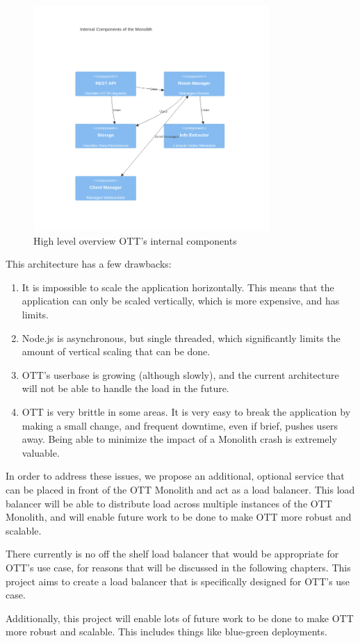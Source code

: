 \begin{figure}[!h]
  \centering
  \includegraphics[width=0.8\textwidth]{Figures/components-monolith.png}
  \caption{High level overview OTT's internal components}
  \label{Figure::components-monolith}
\end{figure}

This architecture has a few drawbacks:

\begin{enumerate}
  \item It is impossible to scale the application horizontally. This means that the application can only be scaled vertically, which is more expensive, and has limits.
  \item Node.js is asynchronous, but single threaded, which significantly limits the amount of vertical scaling that can be done.
  \item OTT's userbase is growing (although slowly), and the current architecture will not be able to handle the load in the future.
  \item OTT is very brittle in some areas. It is very easy to break the application by making a small change, and frequent downtime, even if brief, pushes users away. Being able to minimize the impact of a Monolith crash is extremely valuable.
\end{enumerate}

In order to address these issues, we propose an additional, optional service that can be placed in front of the OTT Monolith and act as a load balancer. This load balancer will be able to distribute load across multiple instances of the OTT Monolith, and will enable future work to be done to make OTT more robust and scalable.

There currently is no off the shelf load balancer that would be appropriate for OTT's use case, for reasons that will be discussed in the following chapters. This project aims to create a load balancer that is specifically designed for OTT's use case.

Additionally, this project will enable lots of future work to be done to make OTT more robust and scalable. This includes things like blue-green deployments.
